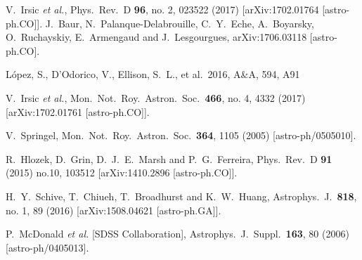 \documentclass[11pt,nofootinbib]{article}
\numberwithin{equation}{section}
\begin{document}
\begin{thebibliography}{99}
  V.~Irsic {\it et al.},
  Phys.\ Rev.\ D {\bf 96}, no. 2, 023522 (2017)
  [arXiv:1702.01764 [astro-ph.CO]].
  J.~Baur, N.~Palanque-Delabrouille, C.~Y.~Eche, A.~Boyarsky, O.~Ruchayskiy, E.~Armengaud and J.~Lesgourgues,
  arXiv:1706.03118 [astro-ph.CO].

 L{\'o}pez, S., D'Odorico, V., Ellison, S.~L., et al.\ 2016, A\&A, 594, A91 

  V.~Irsic {\it et al.},
  Mon.\ Not.\ Roy.\ Astron.\ Soc.\  {\bf 466}, no. 4, 4332 (2017)
  [arXiv:1702.01761 [astro-ph.CO]].
 
  V.~Springel,
  Mon.\ Not.\ Roy.\ Astron.\ Soc.\  {\bf 364}, 1105 (2005)
  [astro-ph/0505010].

  R.~Hlozek, D.~Grin, D.~J.~E.~Marsh and P.~G.~Ferreira,
  Phys.\ Rev.\ D {\bf 91} (2015) no.10,  103512
  [arXiv:1410.2896 [astro-ph.CO]].

  H.~Y.~Schive, T.~Chiueh, T.~Broadhurst and K.~W.~Huang,
  Astrophys.\ J.\  {\bf 818}, no. 1, 89 (2016)
  [arXiv:1508.04621 [astro-ph.GA]].

  P.~McDonald {\it et al.} [SDSS Collaboration],
  Astrophys.\ J.\ Suppl.\  {\bf 163}, 80 (2006)
  [astro-ph/0405013].


\end{thebibliography}
\end{document}
